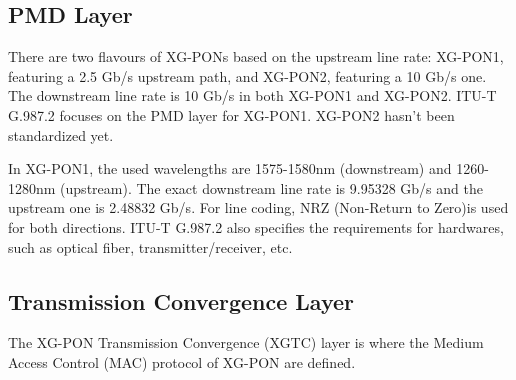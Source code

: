 


\subsection{PMD Layer}
There are two flavours of XG-PONs based on the upstream line rate:
XG-PON1, featuring a 2.5 Gb/s upstream path, and XG-PON2,
featuring a 10 Gb/s one. The downstream line rate is 10 Gb/s in
both XG-PON1 and XG-PON2. ITU-T G.987.2 focuses on the PMD layer
for XG-PON1. XG-PON2 hasn't been standardized yet.

In XG-PON1, the used wavelengths are 1575-1580nm (downstream) and
1260-1280nm (upstream). The exact downstream line rate is 9.95328
Gb/s and the upstream one is 2.48832 Gb/s. For line coding, NRZ
(Non-Return to Zero)is used for both directions. ITU-T G.987.2
also specifies the requirements for hardwares, such as optical
fiber, transmitter/receiver, etc.





\subsection{Transmission Convergence Layer}


The XG-PON Transmission Convergence (XGTC) layer is where the Medium
Access Control (MAC) protocol of XG-PON are defined.

